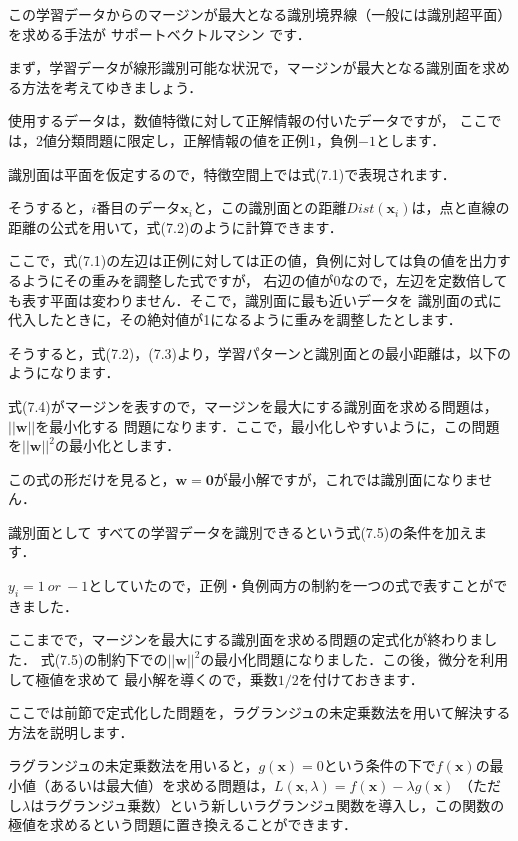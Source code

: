この学習データからのマージンが最大となる識別境界線（一般には識別超平面）を求める手法が
サポートベクトルマシン
です．


まず，学習データが線形識別可能な状況で，マージンが最大となる識別面を求める方法を考えてゆきましょう．

使用するデータは，数値特徴に対して正解情報の付いたデータですが，
ここでは，2値分類問題に限定し，正解情報の値を正例$1$，負例$-1$とします．

識別面は平面を仮定するので，特徴空間上では式(7.1)で表現されます．

そうすると，$i$番目のデータ$\bm{x}_i$と，この識別面との距離$Dist({\bm{x}_i})$は，点と直線の距離の公式を用いて，式(7.2)のように計算できます．

ここで，式(7.1)の左辺は正例に対しては正の値，負例に対しては負の値を出力するようにその重みを調整した式ですが，
右辺の値が0なので，左辺を定数倍しても表す平面は変わりません．そこで，識別面に最も近いデータを
識別面の式に代入したときに，その絶対値が1になるように重みを調整したとします．

そうすると，式(7.2)，(7.3)より，学習パターンと識別面との最小距離は，以下のようになります．

式(7.4)がマージンを表すので，マージンを最大にする識別面を求める問題は，$||\bm{w}||$を最小化する
問題になります．ここで，最小化しやすいように，この問題を$||\bm{w}||^2$の最小化とします．

この式の形だけを見ると，$\bm{w}=\bm{0}$が最小解ですが，これでは識別面になりません．


識別面として
すべての学習データを識別できるという式(7.5)の条件を加えます．

$y_i=1~or~-1$としていたので，正例・負例両方の制約を一つの式で表すことができました．

ここまでで，マージンを最大にする識別面を求める問題の定式化が終わりました．
式(7.5)の制約下での$||\bm{w} ||^2$の最小化問題になりました．この後，微分を利用して極値を求めて
最小解を導くので，乗数$1/2$を付けておきます．


ここでは前節で定式化した問題を，ラグランジュの未定乗数法を用いて解決する方法を説明します．

ラグランジュの未定乗数法を用いると，$g(\bm{x})=0$という条件の下で$f(\bm{x})$の最小値（あるいは最大値）を求める問題は，$L(\bm{x}, \lambda)=f(\bm{x})-\lambda g(\bm{x})$ （ただし$\lambda$はラグランジュ乗数）という新しいラグランジュ関数を導入し，この関数の極値を求めるという問題に置き換えることができます．

